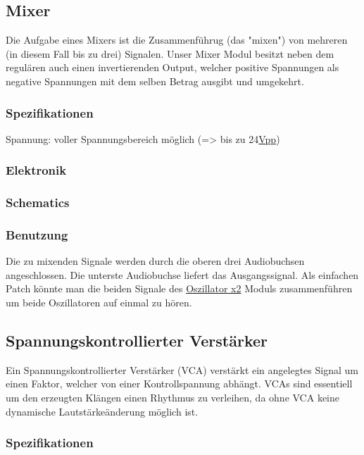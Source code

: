 \subsection{Mixer}
\label{sec:orgd292d03}
Die Aufgabe eines Mixers ist die Zusammenführug (das "mixen") von mehreren (in diesem Fall bis zu drei) Signalen. Unser Mixer Modul besitzt neben dem regulären auch einen invertierenden Output, welcher positive Spannungen als negative Spannungen mit dem selben Betrag ausgibt und umgekehrt.

\subsubsection{Spezifikationen}
\label{sec:orga0023b5}
Spannung: voller Spannungsbereich möglich (=> bis zu 24\href{file:///home/felixp/Documents/diplomarbeit/dokumentation/content/hauptteil.org}{Vpp})
\subsubsection{Elektronik}
\label{sec:org69e9f62}
\subsubsection{Schematics}
\label{sec:org7a1e349}
\subsubsection{Benutzung}
\label{sec:org6771916}
Die zu mixenden Signale werden durch die oberen drei Audiobuchsen angeschlossen. Die unterste Audiobuchse liefert das Ausgangssignal. Als einfachen Patch könnte man die beiden Signale des \href{modules/oscillator.org}{Oszillator x2} Moduls zusammenführen um beide Oszillatoren auf einmal zu hören.

\subsection{Spannungskontrollierter Verstärker}
\label{sec:orgffbc862}
Ein Spannungskontrollierter Verstärker (VCA) verstärkt ein angelegtes Signal um einen Faktor, welcher von einer Kontrollspannung abhängt. VCAs sind essentiell um den erzeugten Klängen einen Rhythmus zu verleihen, da ohne VCA keine dynamische Lautstärkeänderung möglich ist. 

\subsubsection{Spezifikationen}
\label{sec:org4eeef1a}
